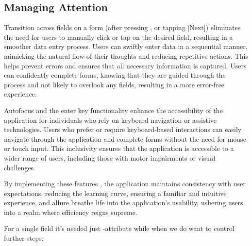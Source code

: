 
\subsection{Managing Attention}

Transition across fields on a form (after pressing , or tapping \key{$\rightarrow$} [Next]) eliminates the 
need for users to manually click or tap on the desired field, resulting in a smoother data entry process. Users can 
swiftly enter data in a sequential manner, mimicking the natural flow of their thoughts and reducing repetitive actions. 
This helps prevent errors and ensures that all necessary information is captured. Users can confidently complete forms, 
knowing that they are guided through the process and not likely to overlook any fields, resulting in a more error-free 
experience.

Autofocus and the enter key functionality enhance the accessibility of the application for individuals who rely on 
keyboard navigation or assistive technologies. Users who prefer or require keyboard-based interactions can easily 
navigate through the application and complete forms without the need for mouse or touch input. This inclusivity ensures 
that the application is accessible to a wider range of users, including those with motor impairments or visual 
challenges.

By implementing these features , the application maintains consistency with user expectations, reducing 
the learning curve, ensuring a familiar and intuitive experience, and allure breathe life into the application's 
usability, ushering users into a realm where efficiency reigns supreme.

For a single field it's needed just -attribute while when we do want to control further steps:

